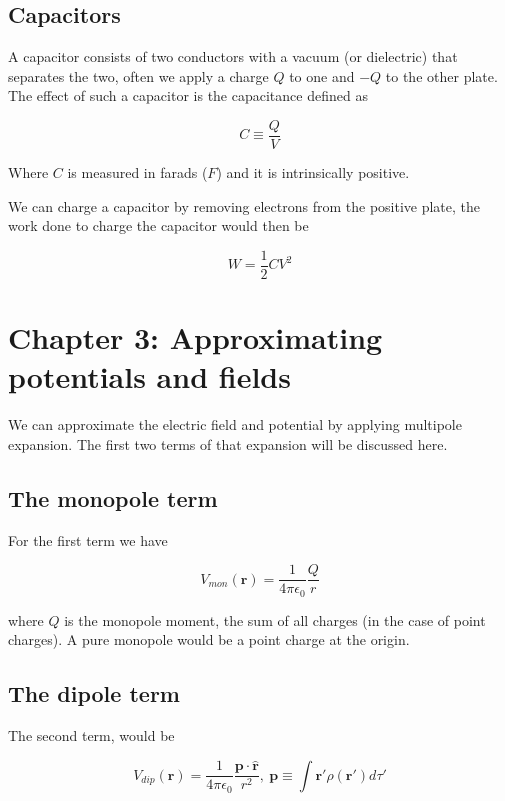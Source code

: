 \documentclass[a4paper]{article}
\begin{document}
\subsection{Capacitors}
A capacitor consists of two conductors with a vacuum (or dielectric) that separates the two, often we apply a charge $Q$ to one and $-Q$ to the other plate. The effect of such a capacitor is the capacitance defined as

\begin{equation}
    C \equiv \frac{Q}{V}
\end{equation}

Where $C$ is measured in farads ($F$) and it is intrinsically positive. 

\bigskip

We can charge a capacitor by removing electrons from the positive plate, the work done to charge the capacitor would then be

\begin{equation}
    W=\frac{1}{2}CV^2
\end{equation}

\section{Chapter 3: Approximating potentials and fields}
We can approximate the electric field and potential by applying multipole expansion. The first two terms of that expansion will be discussed here.
\subsection{The monopole term}
For the first term we have 

\begin{equation}
    V_{mon}(\bm{r})=\frac{1}{4\pi\epsilon_0}\frac{Q}{r}
\end{equation}

where $Q$ is the monopole moment, the sum of all charges (in the case of point charges). A pure monopole would be a point charge at the origin.

\subsection{The dipole term}
The second term, would be

\begin{equation}
    V_{dip}(\bm{r})=\frac{1}{4\pi\epsilon_0}\frac{\bm{p}\cdot\hat{\bm{r}}}{r^2},\ \bm{p} \equiv \int \bm{r}'\rho(\bm{r}')d\tau'
\end{equation}
\end{document}
